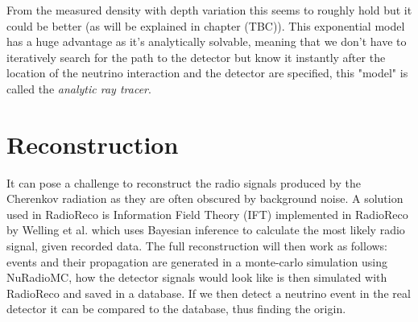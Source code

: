 \documentclass[11pt,a4paper,faculty=we,language=en,doctype=report]{cls/ugent-doc}
\begin{document}
From the measured density with depth variation this seems to
roughly hold but it could be better (as will be explained in chapter
(TBC)).
This exponential model has a huge advantage as it's analytically 
solvable, meaning that we don't have to iteratively search for the 
path to the detector but know it instantly after the location of
the neutrino interaction and the detector are specified, this
"model" is called the \textit{analytic ray tracer}.
\section{Reconstruction}
It can pose a challenge to reconstruct the radio signals produced by
the Cherenkov radiation as they are often obscured by background
noise. A solution used in RadioReco is Information Field Theory
(IFT) implemented in RadioReco by Welling et al.\cite{Welling_2021}
which uses Bayesian inference to calculate the most likely radio
signal, given recorded data.  The full reconstruction will then work
as follows: events and their propagation are generated in a
monte-carlo simulation using
NuRadioMC\cite{Glaser_2019}\cite{Glaser_2020}, how the detector
signals would look like is then simulated with RadioReco and saved
in a database.  If we then detect a neutrino event in the real
detector it can be compared to the database, thus finding the
origin.
\end{document}
